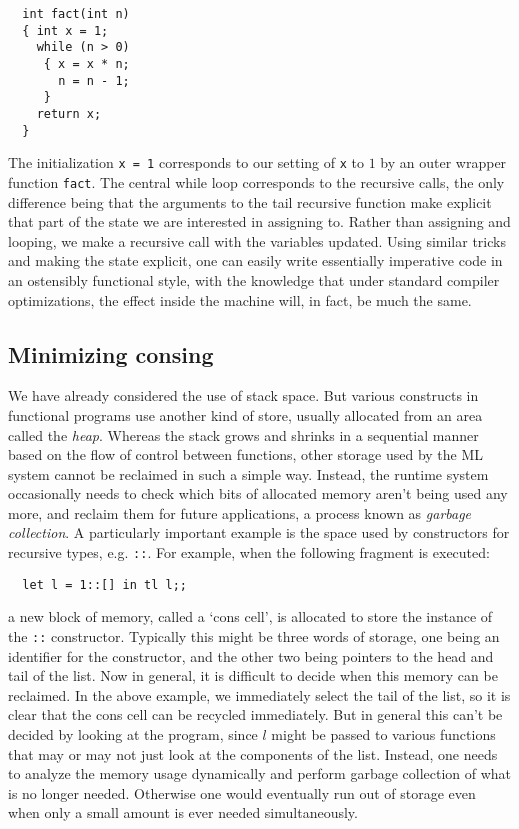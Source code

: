 \begin{verbatim}
  int fact(int n)
  { int x = 1;
    while (n > 0)
     { x = x * n;
       n = n - 1;
     }
    return x;
  }
\end{verbatim}

The initialization {\tt x = 1} corresponds to our setting of {\tt x} to $1$ by
an outer wrapper function {\tt fact}. The central while loop corresponds to the
recursive calls, the only difference being that the arguments to the tail
recursive function make explicit that part of the state we are interested in
assigning to. Rather than assigning and looping, we make a recursive call with
the variables updated. Using similar tricks and making the state explicit, one
can easily write essentially imperative code in an ostensibly functional style,
with the knowledge that under standard compiler optimizations, the effect
inside the machine will, in fact, be much the same.

\subsection{Minimizing consing}

We have already considered the use of stack space. But various constructs in
functional programs use another kind of store, usually allocated from an area
called the {\em heap}. Whereas the stack grows and shrinks in a sequential
manner based on the flow of control between functions, other storage used by
the ML system cannot be reclaimed in such a simple way. Instead, the runtime
system occasionally needs to check which bits of allocated memory aren't being
used any more, and reclaim them for future applications, a process known as
{\em garbage collection}. A particularly important example is the space used by
constructors for recursive types, e.g. {\tt ::}. For example, when the
following fragment is executed:

\begin{boxed}\begin{verbatim}
  let l = 1::[] in tl l;;
\end{verbatim}\end{boxed}

\noindent a new block of memory, called a `cons cell', is allocated to store
the instance of the {\tt ::} constructor. Typically this might be three words
of storage, one being an identifier for the constructor, and the other two
being pointers to the head and tail of the list. Now in general, it is
difficult to decide when this memory can be reclaimed. In the above example, we
immediately select the tail of the list, so it is clear that the cons cell can
be recycled immediately. But in general this can't be decided by looking at the
program, since $l$ might be passed to various functions that may or may not
just look at the components of the list. Instead, one needs to analyze the
memory usage dynamically and perform garbage collection of what is no longer
needed. Otherwise one would eventually run out of storage even when only a
small amount is ever needed simultaneously.

